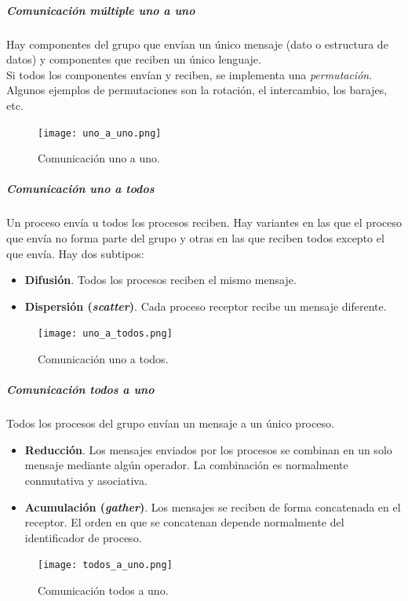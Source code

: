 \documentclass[12pt,spanish]{article}
\begin{document}
\subparagraph{Comunicación múltiple uno a uno}
Hay componentes del grupo que envían un único mensaje (dato o estructura de datos) y componentes que reciben un único lenguaje.\\

Si todos los componentes envían y reciben, se implementa una \emph{permutación}. Algunos ejemplos de permutaciones son la rotación, el intercambio, los barajes, etc.

\begin{figure}[H]
\centering
\texttt{[image: uno\_a\_uno.png]}
\caption{Comunicación uno a uno.}
\end{figure}

\subparagraph{Comunicación uno a todos}


Un proceso envía u todos los procesos reciben. Hay variantes en las que el proceso que envía no forma parte del grupo y otras en las que reciben todos excepto el que envía. Hay dos subtipos:

\begin{itemize}
	\item \textbf{Difusión}. Todos los procesos reciben el mismo mensaje.
	\item \textbf{Dispersión (\textit{scatter})}. Cada proceso receptor recibe un mensaje diferente.	
\end{itemize}

\begin{figure}[H]
\centering
\texttt{[image: uno\_a\_todos.png]}
\caption{Comunicación uno a todos.}
\end{figure}


\subparagraph{Comunicación todos a uno}

Todos los procesos del grupo envían un mensaje a un único proceso.

\begin{itemize}
	\item \textbf{Reducción}. Los mensajes enviados por los procesos se combinan en un solo mensaje mediante algún operador. La combinación es normalmente conmutativa y asociativa.
	\item \textbf{Acumulación (\textit{gather})}. Los mensajes se reciben de forma concatenada en el receptor. El orden en que se concatenan depende normalmente del identificador de proceso.
\end{itemize}

\begin{figure}[H]
\centering
\texttt{[image: todos\_a\_uno.png]}
\caption{Comunicación todos a uno.}
\end{figure}
\end{document}
